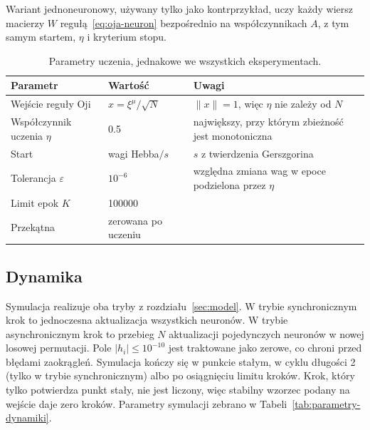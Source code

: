 \noindent Wariant jednoneuronowy, używany tylko jako kontrprzykład, uczy każdy wiersz macierzy $W$ regułą~\eqref{eq:oja-neuron} bezpośrednio na współczynnikach $A$, z tym samym startem, $\eta$ i kryterium stopu.

\begin{table}[H]
    \centering
    \caption{Parametry uczenia, jednakowe we wszystkich eksperymentach.}
    \label{tab:parametry-uczenia}
    \small
    \begin{tabularx}{\textwidth}{l l X}
        \toprule
        Parametr & Wartość & Uwagi \\
        \midrule
        Wejście reguły Oji & $x = \xi^\mu / \sqrt{N}$ & $\lVert x \rVert = 1$, więc $\eta$ nie zależy od $N$ \\
        Współczynnik uczenia $\eta$ & \num{0.5} & największy, przy którym zbieżność jest monotoniczna \\
        Start & wagi Hebba$/s$ & $s$ z twierdzenia Gerszgorina \\
        Tolerancja $\varepsilon$ & $10^{-6}$ & względna zmiana wag w epoce podzielona przez $\eta$ \\
        Limit epok $K$ & \num{100000} & \\
        Przekątna & zerowana po uczeniu & \\
        \bottomrule
    \end{tabularx}
\end{table}

\subsection{Dynamika}
\label{sec:dynamika}

Symulacja realizuje oba tryby z rozdziału~\ref{sec:model}. W trybie synchronicznym krok to jednoczesna aktualizacja wszystkich neuronów. W trybie asynchronicznym krok to przebieg $N$ aktualizacji pojedynczych neuronów w nowej losowej permutacji. Pole $\lvert h_i \rvert \le 10^{-10}$ jest traktowane jako zerowe, co chroni przed błędami zaokrągleń. Symulacja kończy się w punkcie stałym, w cyklu długości 2 (tylko w trybie synchronicznym) albo po osiągnięciu limitu kroków. Krok, który tylko potwierdza punkt stały, nie jest liczony, więc stabilny wzorzec podany na wejście daje zero kroków. Parametry symulacji zebrano w Tabeli~\ref{tab:parametry-dynamiki}.

